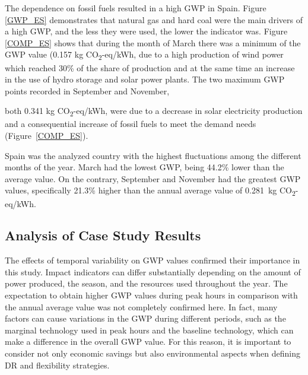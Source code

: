 {{{The dependence on  fossil fuels resulted in a high GWP in Spain. Figure \ref{GWP_ES} demonstrates that natural gas and hard coal were the main drivers of a high GWP, and the less they were used, the lower the indicator was. Figure \ref{COMP_ES} shows that during the month of March there was a minimum of the GWP value {(0.157 kg CO\textsubscript2-eq/kWh}, due to a high production of wind power which reached 30\% of the share of production and at the same time an increase in the use of hydro storage and solar power plants. The two maximum GWP points recorded in September and November, {both  0.341 kg CO\textsubscript2-eq/kWh, were due to a decrease in solar electricity production and a consequential increase of fossil fuels to meet the demand needs (Figure~\ref{COMP_ES}). {Spain was the analyzed country with the highest fluctuations among the different months of the year. March had the lowest GWP, being 44.2\% lower than the average value. On the contrary, September and November had the greatest GWP values, specifically 21.3\% higher than the annual average value of 0.281~kg CO\textsubscript2-eq/kWh.

\subsection{Analysis of Case Study Results} \label{Discussion}

The effects of temporal variability on GWP values confirmed their importance in this study. Impact indicators can differ substantially depending on the amount of power produced, the season, and the resources used throughout the year. The expectation to obtain higher GWP values during peak hours in comparison with the annual average value was not completely confirmed here. In fact, many factors can cause variations in the GWP during different periods, such as the marginal technology used in peak hours and the baseline technology, which can make a difference in the overall GWP value. {For this reason, it is important to consider not only economic savings but also environmental aspects when defining DR and flexibility strategies.}



}}}}}
